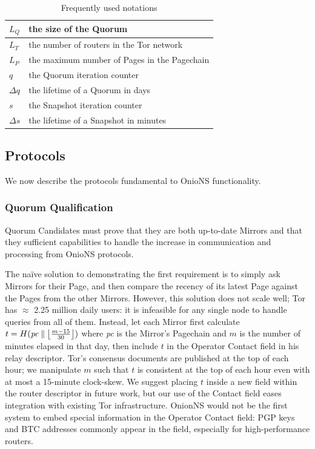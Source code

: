 \documentclass{sig-alternate}
\DeclarePairedDelimiter{\floor}{\lfloor}{\rfloor}
\newcommand*\concat{\mathbin{\|}}
\begin{document}
\begin{table}[h]
	\begin{tabular}{ | l | l | } \hline
    	$ L_{Q} $ & the size of the Quorum \\ \hline
    	$ L_{T} $ & the number of routers in the Tor network \\ \hline
    	$ L_{P} $ & the maximum number of Pages in the Pagechain \\ \hline
    	$ q $ & the Quorum iteration counter \\ \hline
    	$ \Delta q $ & the lifetime of a Quorum in days \\ \hline
    	$ s $ & the Snapshot iteration counter \\ \hline
    	$ \Delta s $ & the lifetime of a Snapshot in minutes \\ \hline
  	\end{tabular}
  	\caption[Table caption text]{Frequently used notations}
\end{table}

\subsection{Protocols}

We now describe the protocols fundamental to OnioNS functionality.

\subsubsection{Quorum Qualification}

Quorum Candidates must prove that they are both up-to-date Mirrors and that they sufficient capabilities to handle the increase in communication and processing from OnioNS protocols.

The na\"{i}ve solution to demonstrating the first requirement is to simply ask Mirrors for their Page, and then compare the recency of its latest Page against the Pages from the other Mirrors. However, this solution does not scale well; Tor has $ \approx $ 2.25 million daily users\cite{TorMetrics}: it is infeasible for any single node to handle queries from all of them. Instead, let each Mirror first calculate $ t = H(\mathit{pc} \concat \floor[\big]{\frac{m - 15}{30}}) $ where \emph{pc} is the Mirror's Pagechain and $ m $ is the number of minutes elapsed in that day, then include $ t $ in the Operator Contact field in his relay descriptor. Tor's consensus documents are published at the top of each hour; we manipulate $ m $ such that $ t $ is consistent at the top of each hour even with at most a 15-minute clock-skew. We suggest placing $ t $ inside a new field within the router descriptor in future work, but our use of the Contact field eases integration with existing Tor infrastructure. OnionNS would not be the first system to embed special information in the Operator Contact field: PGP keys and BTC addresses commonly appear in the field, especially for high-performance routers.
\end{document}
